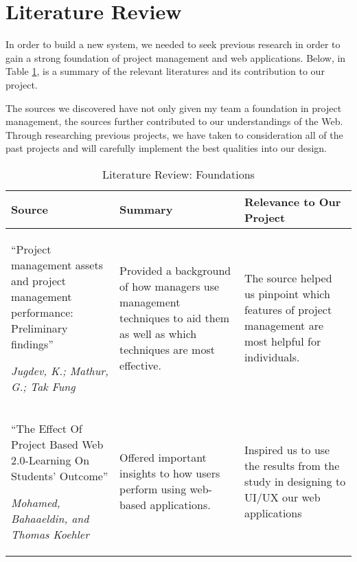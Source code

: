 \section{Literature Review}

In order to build a new system, we needed to seek previous research in order to gain a strong foundation of project management and web applications. Below, in Table \ref{FoundationLitReview}, is a summary of the relevant literatures and its contribution to our project.

\par The sources we discovered have not only given my team a foundation in project management, the sources further contributed to our understandings of the Web. Through researching previous projects, we have taken to consideration all of the past projects and will carefully implement the best qualities into our design. 

\FloatBarrier
\begin{table}%
\caption{Literature Review: Foundations}\label{FoundationLitReview}
\begin{tabularx}{\textwidth}{|X|X|X|}
    \hline
    \textbf{Source} & \textbf{Summary} & \textbf{Relevance to Our Project}\\
    \hline
    ``Project management assets and project management performance: Preliminary findings''
     \par \textit{Jugdev, K.; Mathur, G.; Tak Fung}\cite{Jugdev} & Provided a background of how managers use management techniques to aid them as well as which techniques are most effective. & The source helped us pinpoint which features of project management are most helpful for individuals. \\
    \hline 
    ``The Effect Of Project Based Web 2.0-Learning On Students' Outcome''
	\par \textit{Mohamed, Bahaaeldin, and Thomas Koehler}\cite{Mohamed} & Offered important insights to how users perform using web-based applications. & Inspired us to use the results from the study in designing to UI/UX our web applications \\
	\hline
\end{tabularx}
\end{table}%

